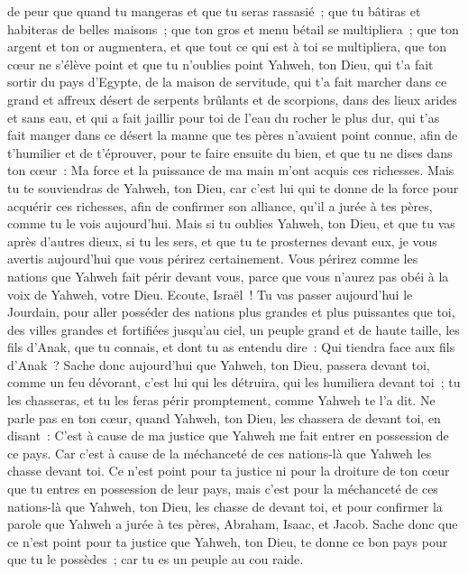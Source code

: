 \begin{multicols}{2}
de peur que quand tu mangeras et que tu seras rassasié~; que tu bâtiras et habiteras de belles maisons~;
que ton gros et menu bétail se multipliera~; que ton argent et ton or augmentera, et que tout ce qui est à toi se multipliera,
que ton cœur ne s'élève point et que tu n'oublies point Yahweh, ton Dieu, qui t'a fait sortir du pays d'Egypte, de la maison de servitude,
qui t'a fait marcher dans ce grand et affreux désert de serpents brûlants et de scorpions, dans des lieux arides et sans eau, et qui a fait jaillir pour toi de l'eau du rocher le plus dur,
qui t'as fait manger dans ce désert la manne que tes pères n'avaient point connue, afin de t'humilier et de t'éprouver, pour te faire ensuite du bien,
et que tu ne dises dans ton cœur~: Ma force et la puissance de ma main m'ont acquis ces richesses.
Mais tu te souviendras de Yahweh, ton Dieu, car c'est lui qui te donne de la force pour acquérir ces richesses, afin de confirmer son alliance, qu'il a jurée à tes pères, comme tu le vois aujourd'hui.
Mais si tu oublies Yahweh, ton Dieu, et que tu vas après d'autres dieux, si tu les sers, et que tu te prosternes devant eux, je vous avertis aujourd'hui que vous périrez certainement.
Vous périrez comme les nations que Yahweh fait périr devant vous, parce que vous n'aurez pas obéi à la voix de Yahweh, votre Dieu.
\VerseOne{}Ecoute, Israël~! Tu vas passer aujourd'hui le Jourdain, pour aller posséder des nations plus grandes et plus puissantes que toi, des villes grandes et fortifiées jusqu'au ciel,
un peuple grand et de haute taille, les fils d'Anak, que tu connais, et dont tu as entendu dire~: Qui tiendra face aux fils d'Anak~?
Sache donc aujourd'hui que Yahweh, ton Dieu, passera devant toi, comme un feu dévorant, c'est lui qui les détruira, qui les humiliera devant toi~; tu les chasseras, et tu les feras périr promptement, comme Yahweh te l'a dit.
Ne parle pas en ton cœur, quand Yahweh, ton Dieu, les chassera de devant toi, en disant~: C'est à cause de ma justice que Yahweh me fait entrer en possession de ce pays. Car c'est à cause de la méchanceté de ces nations-là que Yahweh les chasse devant toi.
Ce n'est point pour ta justice ni pour la droiture de ton cœur que tu entres en possession de leur pays, mais c'est pour la méchanceté de ces nations-là que Yahweh, ton Dieu, les chasse de devant toi, et pour confirmer la parole que Yahweh a jurée à tes pères, Abraham, Isaac, et Jacob.
Sache donc que ce n'est point pour ta justice que Yahweh, ton Dieu, te donne ce bon pays pour que tu le possèdes~; car tu es un peuple au cou raide.

\end{multicols}
